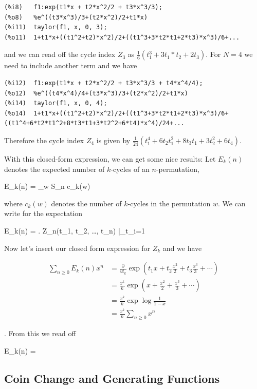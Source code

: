 \begin{verbatim}
(%i8)	f1:exp(t1*x + t2*x^2/2 + t3*x^3/3);
(%o8)	%e^((t3*x^3)/3+(t2*x^2)/2+t1*x)
(%i11)	taylor(f1, x, 0, 3);
(%o11)	1+t1*x+((t1^2+t2)*x^2)/2+((t1^3+3*t2*t1+2*t3)*x^3)/6+...
\end{verbatim}

and we can read off the cycle index $Z_3$ as $\frac{1}{6}(t_1^3+3t_1*t_2+2t_3)$. For $N=4$ we need to include another term and we have

\begin{verbatim}
(%i12)	f1:exp(t1*x + t2*x^2/2 + t3*x^3/3 + t4*x^4/4);
(%o12)	%e^((t4*x^4)/4+(t3*x^3)/3+(t2*x^2)/2+t1*x)
(%i14)	taylor(f1, x, 0, 4);
(%o14)	1+t1*x+((t1^2+t2)*x^2)/2+((t1^3+3*t2*t1+2*t3)*x^3)/6+((t1^4+6*t2*t1^2+8*t3*t1+3*t2^2+6*t4)*x^4)/24+...
\end{verbatim}

Therefore the cycle index $Z_4$ is given by $\frac{1}{24}( t_1^4+6t_2 t_1^2+ 8 t_3 t_1+ 3 t_2^2+6 t_4  )$.

With this closed-form expression, we can get some nice results: Let $E_k(n)$ denotes the expected number of $k$-cycles of an $n$-permutation,

\bee
E_k(n) =  \sum_{w \in S_n} c_k(w)
\eee

where $c_k(w)$ denotes the number of $k$-cycles in the permutation $w$. We can write for the expectation

\bee
E_k(n) = \left.  Z_n(t_1, t_2, \ldots, t_n) \right|_{t_i=1}
\eee

Now let's insert our closed form expression for $Z_k$ and we have

\begin{align*}
  \sum_{n \geq 0} E_k(n) x^n &= \frac{\partial}{\partial t_k} \exp\left(  t_1 x + t_2 \frac{x^2}{2} + t_3 \frac{x^3}{3} + \cdots \right) \\
                             &= \frac{x^k}{k} \exp\left(  x + \frac{x^2}{2} + \frac{x^3}{3} + \cdots \right) \\
                             &= \frac{x^k}{k} \exp \log \frac{1}{1-x} \\
                             &= \frac{x^k}{k} \sum_{n \geq 0} x^n
\end{align*}

. From this we read off

\bee
E_k(n) = 
\eee


\subsection{Coin Change and Generating Functions}

